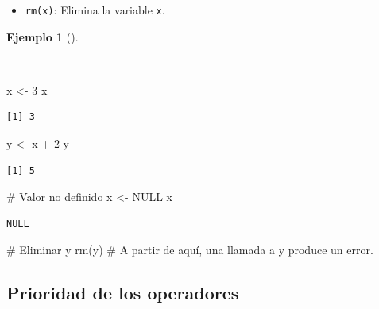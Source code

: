 \documentclass[
  spanish,
  a4paper,
]{scrreport}
\newenvironment{Shaded}{\begin{snugshade}}{\end{snugshade}}
\newcommand{\CommentTok}[1]{\textcolor[rgb]{0.37,0.37,0.37}{#1}}
\newcommand{\ConstantTok}[1]{\textcolor[rgb]{0.56,0.35,0.01}{#1}}
\newcommand{\DecValTok}[1]{\textcolor[rgb]{0.68,0.00,0.00}{#1}}
\newcommand{\FunctionTok}[1]{\textcolor[rgb]{0.28,0.35,0.67}{#1}}
\newcommand{\NormalTok}[1]{\textcolor[rgb]{0.00,0.23,0.31}{#1}}
\newcommand{\OtherTok}[1]{\textcolor[rgb]{0.00,0.23,0.31}{#1}}
\newcommand{\SpecialCharTok}[1]{\textcolor[rgb]{0.37,0.37,0.37}{#1}}
\providecommand{\tightlist}{%
  \setlength{\itemsep}{0pt}\setlength{\parskip}{0pt}}
\theoremstyle{definition}
\theoremstyle{definition}
\newtheorem{example}{Ejemplo}[chapter]
\theoremstyle{remark}
\begin{document}
\begin{itemize}
\tightlist
\item
  \texttt{rm(x)}: Elimina la variable \texttt{x}.
\end{itemize}

\begin{example}[]\protect\hypertarget{exm-variables}{}\label{exm-variables}

~

\begin{Shaded}
\begin{Highlighting}[]
\NormalTok{x }\OtherTok{\textless{}{-}} \DecValTok{3}
\NormalTok{x}
\end{Highlighting}
\end{Shaded}

\begin{verbatim}
[1] 3
\end{verbatim}

\begin{Shaded}
\begin{Highlighting}[]
\NormalTok{y }\OtherTok{\textless{}{-}}\NormalTok{ x }\SpecialCharTok{+} \DecValTok{2}
\NormalTok{y}
\end{Highlighting}
\end{Shaded}

\begin{verbatim}
[1] 5
\end{verbatim}

\begin{Shaded}
\begin{Highlighting}[]
\CommentTok{\# Valor no definido}
\NormalTok{x }\OtherTok{\textless{}{-}} \ConstantTok{NULL}
\NormalTok{x}
\end{Highlighting}
\end{Shaded}

\begin{verbatim}
NULL
\end{verbatim}

\begin{Shaded}
\begin{Highlighting}[]
\CommentTok{\# Eliminar y}
\FunctionTok{rm}\NormalTok{(y)}
\CommentTok{\# A partir de aquí, una llamada a y produce un error.}
\end{Highlighting}
\end{Shaded}

\end{example}

\subsection{Prioridad de los
operadores}\label{prioridad-de-los-operadores}
\end{document}

